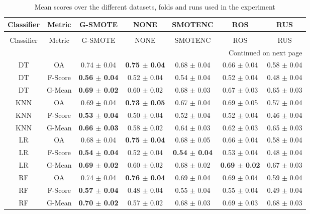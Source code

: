 \begin{longtable}{ccccccc}
\caption{Mean scores over the different datasets, folds and runs used in the experiment}
\label{tbl:mean_sem_scores}\\
\toprule
Classifier &  Metric &                  G-SMOTE &                     NONE &                  SMOTENC &                      ROS &             RUS \\
\midrule
\endfirsthead
\caption[]{Mean scores over the different datasets, folds and runs used in the experiment} \\
\toprule
Classifier &  Metric &                  G-SMOTE &                     NONE &                  SMOTENC &                      ROS &             RUS \\
\midrule
\endhead
\midrule
\multicolumn{7}{r}{{Continued on next page}} \\
\midrule
\endfoot

\bottomrule
\endlastfoot
        DT &      OA &          0.74 $\pm$ 0.04 & \textbf{0.75 $\pm$ 0.04} &          0.68 $\pm$ 0.04 &          0.66 $\pm$ 0.04 & 0.58 $\pm$ 0.04 \\
        DT & F-Score & \textbf{0.56 $\pm$ 0.04} &          0.52 $\pm$ 0.04 &          0.54 $\pm$ 0.04 &          0.52 $\pm$ 0.04 & 0.48 $\pm$ 0.04 \\
        DT &  G-Mean & \textbf{0.69 $\pm$ 0.02} &          0.60 $\pm$ 0.02 &          0.68 $\pm$ 0.03 &          0.67 $\pm$ 0.03 & 0.65 $\pm$ 0.03 \\
       KNN &      OA &          0.69 $\pm$ 0.04 & \textbf{0.73 $\pm$ 0.05} &          0.67 $\pm$ 0.04 &          0.69 $\pm$ 0.05 & 0.57 $\pm$ 0.04 \\
       KNN & F-Score & \textbf{0.53 $\pm$ 0.04} &          0.50 $\pm$ 0.04 &          0.52 $\pm$ 0.04 &          0.52 $\pm$ 0.04 & 0.46 $\pm$ 0.04 \\
       KNN &  G-Mean & \textbf{0.66 $\pm$ 0.03} &          0.58 $\pm$ 0.02 &          0.64 $\pm$ 0.03 &          0.62 $\pm$ 0.03 & 0.65 $\pm$ 0.03 \\
        LR &      OA &          0.68 $\pm$ 0.04 & \textbf{0.75 $\pm$ 0.04} &          0.68 $\pm$ 0.05 &          0.66 $\pm$ 0.04 & 0.58 $\pm$ 0.04 \\
        LR & F-Score & \textbf{0.54 $\pm$ 0.04} &          0.52 $\pm$ 0.04 & \textbf{0.54 $\pm$ 0.04} &          0.53 $\pm$ 0.04 & 0.48 $\pm$ 0.04 \\
        LR &  G-Mean & \textbf{0.69 $\pm$ 0.02} &          0.60 $\pm$ 0.02 &          0.68 $\pm$ 0.02 & \textbf{0.69 $\pm$ 0.02} & 0.67 $\pm$ 0.03 \\
        RF &      OA &          0.74 $\pm$ 0.04 & \textbf{0.76 $\pm$ 0.04} &          0.69 $\pm$ 0.04 &          0.69 $\pm$ 0.04 & 0.59 $\pm$ 0.04 \\
        RF & F-Score & \textbf{0.57 $\pm$ 0.04} &          0.48 $\pm$ 0.04 &          0.55 $\pm$ 0.04 &          0.55 $\pm$ 0.04 & 0.49 $\pm$ 0.04 \\
        RF &  G-Mean & \textbf{0.70 $\pm$ 0.02} &          0.57 $\pm$ 0.02 &          0.68 $\pm$ 0.03 &          0.69 $\pm$ 0.03 & 0.68 $\pm$ 0.03 \\
\end{longtable}
